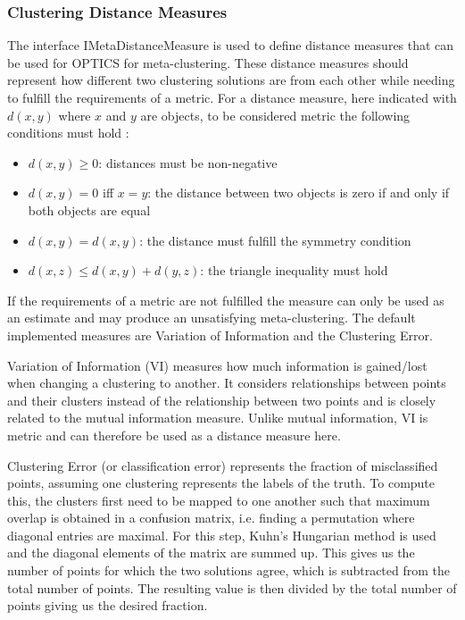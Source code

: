 \documentclass[
	a4paper,
	english,
	twoside,
	openright,               
	11pt                            
	]{report}
\begin{document}
\subsubsection{Clustering Distance Measures}
The interface IMetaDistanceMeasure is used to define distance measures that can be used for OPTICS for meta-clustering. These distance measures should represent how different two clustering solutions are from each other while needing to fulfill the requirements of a metric. For a distance measure, here indicated with $d(x,y)$ where $x$ and $y$ are objects, to be considered metric the following conditions must hold \cite{10.5555/1756006.1953024}:
\begin{itemize}
  \item $d(x,y)\geq0$: distances must be non-negative
  \item $d(x,y)=0$ iff $x=y$: the distance between two objects is zero if and only if both objects are equal
  \item $d(x,y)=d(x,y)$: the distance must fulfill the symmetry condition
  \item $d(x,z)\leq d(x,y)+d(y,z)$: the triangle inequality must hold
\end{itemize}

If the requirements of a metric are not fulfilled the measure can only be used as an estimate and may produce an unsatisfying meta-clustering. The default implemented measures are Variation of Information and the Clustering Error. 

Variation of Information (VI) \cite{10.1007/978-3-540-45167-9_14} measures how much information is gained/lost when changing a clustering to another. It considers relationships between points and their clusters instead of the relationship between two points and is closely related to the mutual information measure. Unlike mutual information, VI is metric and can therefore be used as a distance measure here.

Clustering Error (or classification error) \cite{MEILA2007873} represents the fraction of misclassified points, assuming one clustering represents the labels of the truth. To compute this, the clusters first need to be mapped to one another such that maximum overlap is obtained in a confusion matrix, i.e. finding a permutation where diagonal entries are maximal. For this step, Kuhn’s Hungarian method \cite{Kuhn2010} is used and the diagonal elements of the matrix are summed up. This gives us the number of points for which the two solutions agree, which is subtracted from the total number of points. The resulting value is then divided by the total number of points giving us the desired fraction.
\end{document}
